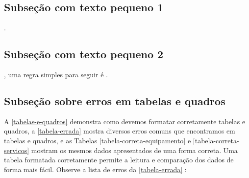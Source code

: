     



\subsection{Subseção com texto pequeno 1}
\label{erros-comuns-sub-pequena1}
.

\subsection{Subseção com texto pequeno 2}
\label{erros-comuns-sub-pequena2}
, uma regra simples para seguir é .


\subsection{Subseção sobre erros em tabelas e quadros}
\label{sub-erros-tabelas}
A \autoref{tabelas-e-quadros} demonstra como devemos formatar corretamente tabelas e quadros, a \autoref{tabela-errada} mostra diversos erros comuns que encontramos em tabelas e quadros, e as Tabelas \ref{tabela-correta-equipamento} e \ref{tabela-correta-servicos} mostram os mesmos dados apresentados de uma forma correta. Uma tabela formatada corretamente permite a leitura e comparação dos dados de forma mais fácil. Observe a lista de erros da \autoref{tabela-errada} :


